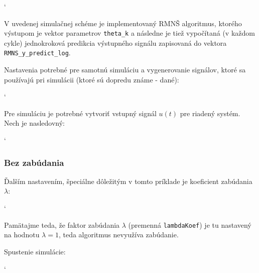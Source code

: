 \documentclass[a4paper, 10pt, ]{article}
\begin{document}
{\catcode`

}

V uvedenej simulačnej schéme je implementovaný RMNŠ algoritmus, ktorého výstupom je vektor parametrov \lstinline{theta_k} a následne je tiež vypočítaná (v každom cykle) jednokroková predikcia výstupného signálu zapisovaná do vektora \lstinline{RMNS_y_predict_log}.

Nastavenia potrebné pre samotnú simuláciu a vygenerovanie signálov, ktoré sa používajú pri simulácii (ktoré sú dopredu známe - dané):

{\catcode`

}

\noindent
Pre simuláciu je potrebné vytvoriť vstupný signál $u(t)$ pre riadený systém. Nech je nasledovný:


{\catcode`

}


\subsubsection{Bez zabúdania}

Ďalším nastavením, špeciálne dôležitým v tomto príklade je koeficient zabúdania $\lambda$:

{\catcode`

}

\noindent
Pamätajme teda, že faktor zabúdania $\lambda$ (premenná \lstinline{lambdaKoef}) je tu nastavený na hodnotu $\lambda = 1$, teda algoritmus nevyužíva zabúdanie.


\noindent
Spustenie simulácie:

{\catcode`

}
\end{document}
